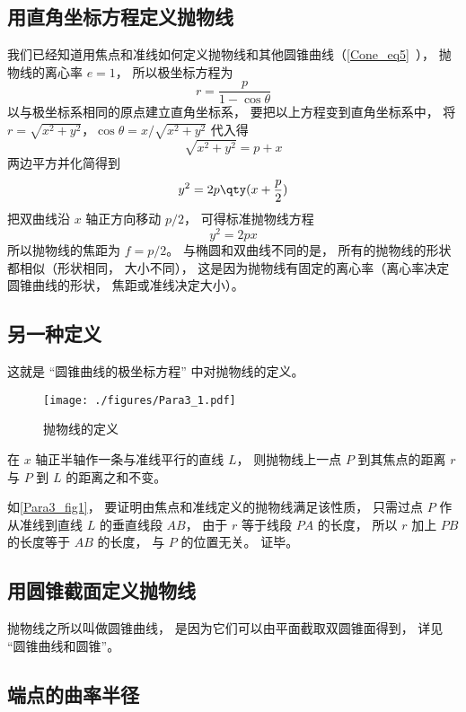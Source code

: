 

\subsection{用直角坐标方程定义抛物线}
我们已经知道用焦点和准线如何定义抛物线和其他圆锥曲线（\autoref{Cone_eq5}~）， 抛物线的离心率 $e = 1$， 所以极坐标方程为
\begin{equation}\label{Para3_eq1}
r = \frac{p}{1 - \cos \theta }
\end{equation}
以与极坐标系相同的原点建立直角坐标系， 要把以上方程变到直角坐标系中， 将$r = \sqrt{x^2 + y^2}$，$\cos \theta  = x/\sqrt{x^2 + y^2}$ 代入得
\begin{equation}
\sqrt{x^2 + y^2}  = p + x
\end{equation}
两边平方并化简得到
\begin{equation}
y^2 = 2p \qty(x + \frac p2)
\end{equation}
把双曲线沿 $x$ 轴正方向移动 $p/2$， 可得标准抛物线方程
\begin{equation}\label{Para3_eq2}
y^2 = 2px
\end{equation}
所以抛物线的焦距为 $f = p/2$。 与椭圆和双曲线不同的是， 所有的抛物线的形状都相似（形状相同， 大小不同）， 这是因为抛物线有固定的离心率（离心率决定圆锥曲线的形状， 焦距或准线决定大小）。

\subsection{另一种定义}
这就是 “圆锥曲线的极坐标方程” 中对抛物线的定义。
\begin{figure}[ht]
\centering
\texttt{[image: ./figures/Para3\_1.pdf]}
\caption{抛物线的定义} \label{Para3_fig1}
\end{figure}

在 $x$ 轴正半轴作一条与准线平行的直线 $L$， 则抛物线上一点 $P$ 到其焦点的距离 $r$ 与 $P$ 到 $L$ 的距离之和不变。

如\autoref{Para3_fig1}， 要证明由焦点和准线定义的抛物线满足该性质， 只需过点 $P$ 作从准线到直线 $L$ 的垂直线段 $AB$， 由于 $r$ 等于线段 $PA$ 的长度， 所以 $r$ 加上 $PB$ 的长度等于 $AB$ 的长度， 与 $P$ 的位置无关。 证毕。

\subsection{用圆锥截面定义抛物线}
抛物线之所以叫做圆锥曲线， 是因为它们可以由平面截取双圆锥面得到， 详见 “圆锥曲线和圆锥”。

\subsection{端点的曲率半径}
